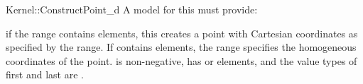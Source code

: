 \begin{ccRefFunctionObjectConcept}{Kernel::ConstructPoint_d}
A model for this must provide:


	{if the range \ccc{[first,last)} contains  elements,
	 this creates a point with Cartesian coordinates as specified by 
	 the range. If \ccc{[first,last)} contains  elements,
	 the range specifies the homogeneous coordinates of the point. 
	 \ccPrecond {} is non-negative, \ccc{[first,last)} has 
	  or  elements, and the value types of first
	 and last are .}

\ccSeeAlso
{}\\

\end{ccRefFunctionObjectConcept}
